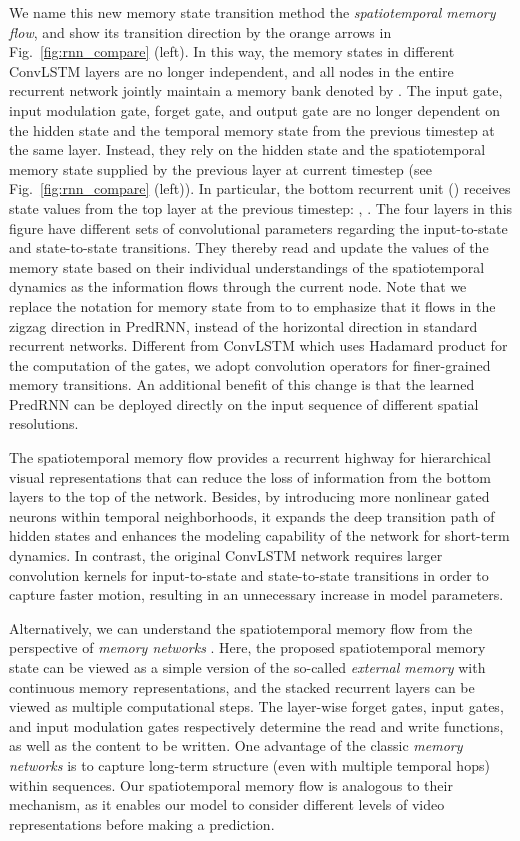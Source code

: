 \documentclass[10pt,journal,compsoc]{IEEEtran}
\newcommand{\fig}[1]{Fig.~\ref{#1}}
\begin{document}
We name this new memory state transition method the \textit{spatiotemporal memory flow}, and show its transition direction by the orange arrows in \fig{fig:rnn_compare} (left).
In this way, the memory states in different ConvLSTM layers are no longer independent, and all nodes in the entire recurrent network jointly maintain a memory bank denoted by . 
The input gate, input modulation gate, forget gate, and output gate are no longer dependent on the hidden state and the temporal memory state from the previous timestep at the same layer. Instead, they rely on the hidden state  and the spatiotemporal memory state  supplied by the previous layer at current timestep (see \fig{fig:rnn_compare} (left)). 
In particular, the bottom recurrent unit () receives state values from the top layer at the previous timestep: , . The four layers in this figure have different sets of convolutional parameters regarding the input-to-state and state-to-state transitions. 
They thereby read and update the values of the memory state based on their individual understandings of the spatiotemporal dynamics as the information flows through the current node.
Note that we replace the notation for memory state from  to  to emphasize that it flows in the zigzag direction in PredRNN, instead of the horizontal direction in standard recurrent networks. 
Different from ConvLSTM which uses Hadamard product  for the computation of the gates, we adopt convolution operators  for finer-grained memory transitions. An additional benefit of this change is that the learned PredRNN can be deployed directly on the input sequence of different spatial resolutions.


The spatiotemporal memory flow provides a recurrent highway for hierarchical visual representations that can reduce the loss of information from the bottom layers to the top of the network. 
Besides, by introducing more nonlinear gated neurons within temporal neighborhoods, it expands the deep transition path of hidden states and enhances the modeling capability of the network for short-term dynamics.
In contrast, the original ConvLSTM network requires larger convolution kernels for input-to-state and state-to-state transitions in order to capture faster motion, resulting in an unnecessary increase in model parameters.


Alternatively, we can understand the spatiotemporal memory flow from the perspective of \textit{memory networks} \cite{graves2014neural,sukhbaatar2015end,graves2016hybrid}. Here, the proposed spatiotemporal memory state  can be viewed as a simple version of the so-called \textit{external memory} with continuous memory representations, and the stacked recurrent layers can be viewed as multiple computational steps. The layer-wise forget gates, input gates, and input modulation gates respectively determine the read and write functions, as well as the content to be written. One advantage of the classic \textit{memory networks} is to capture long-term structure (even with multiple temporal hops) within sequences. Our spatiotemporal memory flow is analogous to their mechanism, as it enables our model to consider different levels of video representations before making a prediction.
\end{document}
